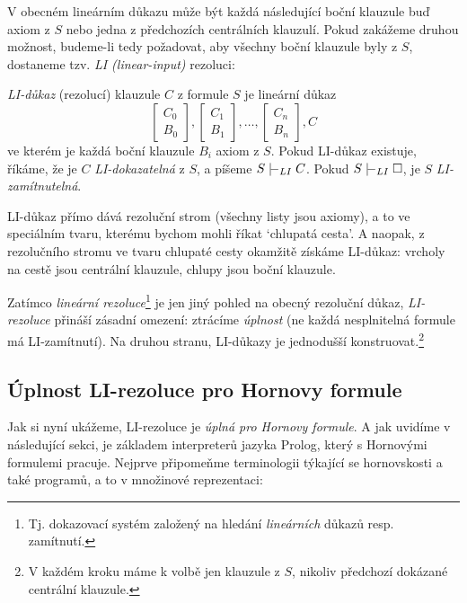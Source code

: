 V obecném lineárním důkazu může být každá následující boční klauzule buď axiom z $S$ nebo jedna z předchozích centrálních klauzulí. Pokud zakážeme druhou možnost, budeme-li tedy požadovat, aby všechny boční klauzule byly z $S$, dostaneme tzv. \emph{LI (linear-input)} rezoluci:
    
\begin{definition}[LI-důkaz]
    \emph{LI-důkaz} (rezolucí) klauzule $C$ z formule $S$ je lineární důkaz 
    $$
    \begin{bmatrix}
        C_0 \\
        B_0
    \end{bmatrix},
    \begin{bmatrix}
        C_1 \\
        B_1
    \end{bmatrix},\dots,
    \begin{bmatrix}
        C_n \\
        B_n
    \end{bmatrix},
    C
    $$
    ve kterém je každá boční klauzule $B_i$ axiom z $S$. Pokud LI-důkaz existuje, říkáme, že je $C$ \emph{LI-dokazatelná} z $S$, a píšeme $S\proves_{LI}C$. Pokud $S\proves_{LI}\square$, je $S$ \emph{LI-zamítnutelná}.
\end{definition}

\begin{remark}
    LI-důkaz přímo dává rezoluční strom (všechny listy jsou axiomy), a to ve speciálním tvaru, kterému bychom mohli říkat `chlupatá cesta'. A naopak, z rezolučního stromu ve tvaru chlupaté cesty okamžitě získáme LI-důkaz: vrcholy na cestě jsou centrální klauzule, chlupy jsou boční klauzule.
\end{remark}

Zatímco \emph{lineární rezoluce}\footnote{Tj. dokazovací systém založený na hledání \emph{lineárních} důkazů resp. zamítnutí.} je jen jiný pohled na obecný rezoluční důkaz, \emph{LI-rezoluce} přináší zásadní omezení: ztrácíme \emph{úplnost} (ne každá nesplnitelná formule má LI-zamítnutí). Na druhou stranu, LI-důkazy je jednodušší konstruovat.\footnote{V každém kroku máme k volbě jen klauzule z $S$, nikoliv předchozí dokázané centrální klauzule.} 

\subsection{Úplnost LI-rezoluce pro Hornovy formule}

Jak si nyní ukážeme, LI-rezoluce je \emph{úplná pro Hornovy formule}. A jak uvidíme v následující sekci, je základem interpreterů jazyka Prolog, který s Hornovými formulemi pracuje. Nejprve připomeňme terminologii týkající se hornovskosti a také programů, a to v množinové reprezentaci:

